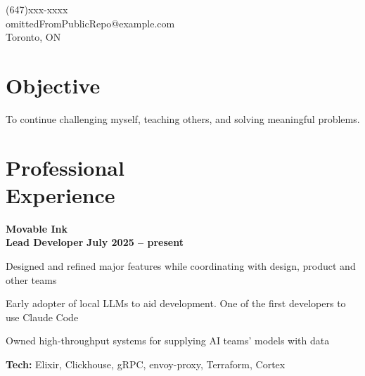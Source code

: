 \documentclass[margin,line]{resume}
\begin{document}
\sffamily %

{
	\sc
    \hfill (647)xxx-xxxx                  \vspace{0mm}\\\vspace{0mm}
    \hfill omittedFromPublicRepo@example.com            \vspace{0mm}\\\vspace{0mm}
    \hfill Toronto, ON                \vspace{0mm}\\\vspace{-10mm}
}

\begin{resume}

\vspace{1mm}

    \section{\mysidestyle \textbf{\large{O}\small{bjective}}}

	\hspace{-3mm}To continue challenging myself, teaching others, and solving meaningful problems.

\sectionline

    \section{\mysidestyle \textbf{\large{P}\small{rofessional\\Experience}}}

    \hspace{-3mm}\textbf{\listing Movable Ink} \vspace{2mm}\\\vspace{1mm}
    \hspace{1.2mm}\textbf{Lead Developer} \hfill \textbf{July 2025 -- present}\vspace{1mm}
    \begin{list2}
        \item Designed and refined major features while coordinating with design, product and other teams
        \vspace{1mm}
        \item Early adopter of local LLMs to aid development. One of the first developers to use Claude Code
        \vspace{1mm}
        \item Owned high-throughput systems for supplying AI teams' models with data
        \vspace{1mm}
        \item\textbf{Tech:} Elixir, Clickhouse, gRPC, envoy-proxy, Terraform, Cortex
    \end{list2}



\end{resume}
\end{document}
